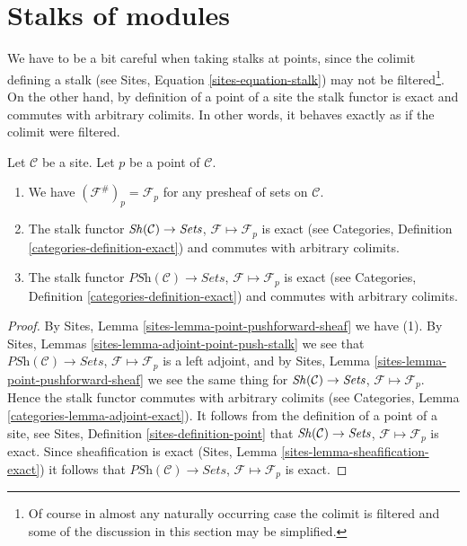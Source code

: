 \section{Stalks of modules}
\label{section-stalks}

\noindent
We have to be a bit careful when taking stalks at points,
since the colimit defining a stalk (see
Sites, Equation \ref{sites-equation-stalk})
may not be filtered\footnote{Of course in almost any naturally occurring
case the colimit is filtered and some of the discussion in this section
may be simplified.}. On the other hand, by definition of a point of a site
the stalk functor is exact and commutes with arbitrary colimits.
In other words, it behaves exactly as if the colimit were filtered.

\begin{lemma}
\label{lemma-stalk-exact}
Let $\mathcal{C}$ be a site.
Let $p$ be a point of $\mathcal{C}$.
\begin{enumerate}
\item We have $(\mathcal{F}^\#)_p = \mathcal{F}_p$
for any presheaf of sets on $\mathcal{C}$.
\item The stalk functor
$\mathop{\mathit{Sh}}\nolimits(\mathcal{C}) \to \textit{Sets}$,
$\mathcal{F} \mapsto \mathcal{F}_p$ is exact (see
Categories, Definition \ref{categories-definition-exact})
and commutes with arbitrary colimits.
\item The stalk functor
$\textit{PSh}(\mathcal{C}) \to \textit{Sets}$,
$\mathcal{F} \mapsto \mathcal{F}_p$ is exact (see
Categories, Definition \ref{categories-definition-exact})
and commutes with arbitrary colimits.
\end{enumerate}
\end{lemma}

\begin{proof}
By
Sites, Lemma \ref{sites-lemma-point-pushforward-sheaf}
we have (1).
By
Sites, Lemmas \ref{sites-lemma-adjoint-point-push-stalk}
we see that
$\textit{PSh}(\mathcal{C}) \to \textit{Sets}$,
$\mathcal{F} \mapsto \mathcal{F}_p$ is a left adjoint,
and by
Sites, Lemma \ref{sites-lemma-point-pushforward-sheaf}
we see the same thing for
$\mathop{\mathit{Sh}}\nolimits(\mathcal{C}) \to \textit{Sets}$,
$\mathcal{F} \mapsto \mathcal{F}_p$.
Hence the stalk functor commutes with arbitrary colimits (see
Categories, Lemma \ref{categories-lemma-adjoint-exact}).
It follows from the definition of a point of a site, see
Sites, Definition \ref{sites-definition-point}
that $\mathop{\mathit{Sh}}\nolimits(\mathcal{C}) \to \textit{Sets}$,
$\mathcal{F} \mapsto \mathcal{F}_p$
is exact. Since sheafification is exact
(Sites, Lemma \ref{sites-lemma-sheafification-exact})
it follows that $\textit{PSh}(\mathcal{C}) \to \textit{Sets}$,
$\mathcal{F} \mapsto \mathcal{F}_p$
is exact.
\end{proof}

